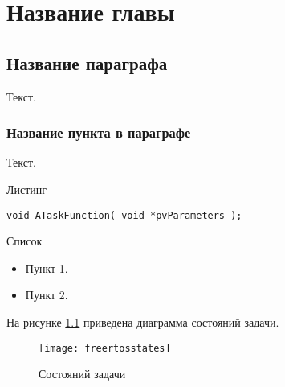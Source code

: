 
\chapter{Название главы}
\section{Название параграфа}

Текст.

\subsection{Название пункта в параграфе}

Текст.

Листинг
\begin{verbatim}
void ATaskFunction( void *pvParameters );
\end{verbatim}

Список
\begin{itemize}
	\item Пункт 1. 
	\item Пункт 2.  
\end{itemize}
 
На рисунке \ref{fig:freertosstates} приведена диаграмма состояний задачи. 

\begin{figure}[h!]
	\centering
	\texttt{[image: freertosstates]}
	\caption{ Состояний задачи \label{fig:freertosstates}}
\end{figure}
